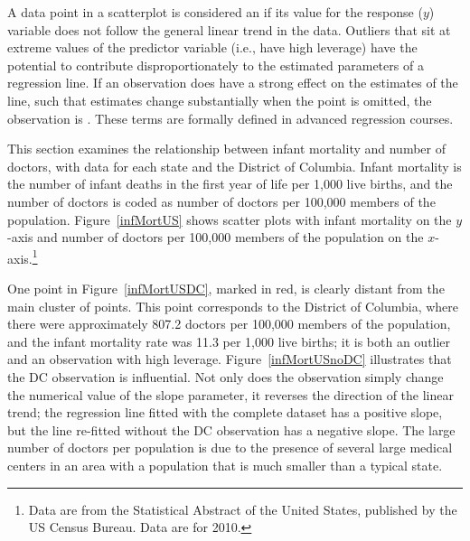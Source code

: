A data point in a scatterplot is considered an  if its value for the response ($y$) variable does not follow the general linear trend in the data. Outliers that sit at extreme values of the predictor variable (i.e., have high leverage) have the potential to contribute disproportionately to the estimated parameters of a regression line. If an observation does have a strong effect on the estimates of the line, such that estimates change substantially when the point is omitted, the observation is . These terms are formally defined in advanced regression courses.


This section examines the relationship between infant mortality and number of doctors, with data for each state and the District of Columbia. Infant mortality is the number of infant deaths in the first year of life per 1,000 live births, and the number of doctors is coded as number of doctors per 100,000 members of the population. Figure~\ref{infMortUS} shows scatter plots with infant mortality on the $y$-axis and number of doctors per 100,000 members of the population on the $x$-axis.\footnote{Data are from the Statistical Abstract of the United States, published by the US Census Bureau. Data are for 2010.} 

One point in Figure~\ref{infMortUSDC}, marked in red, is clearly distant from the main cluster of points. This point corresponds to the District of Columbia, where there were approximately 807.2 doctors per 100,000 members of the population, and the infant mortality rate was 11.3 per 1,000 live births; it is both an outlier and an observation with high leverage. Figure~\ref{infMortUSnoDC} illustrates that the DC observation is influential. Not only does the observation simply change the numerical value of the slope parameter, it reverses the direction of the linear trend; the regression line fitted with the complete dataset has a positive slope, but the line re-fitted without the DC observation has a negative slope. The large number of doctors per population is due to the presence of several large medical centers in an area with a population that is much smaller than a typical state.

